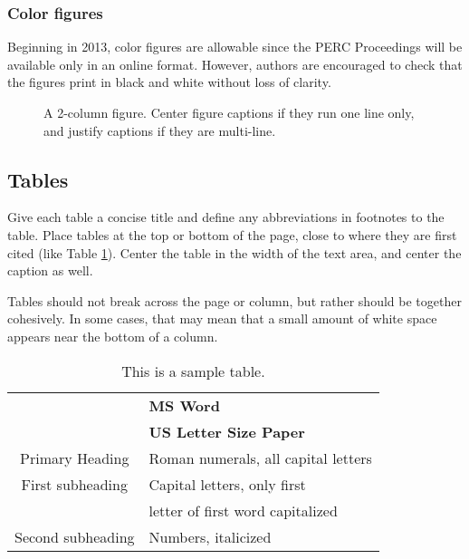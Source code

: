 \documentclass[english,aps,pra,reprint,noshowpacs,superscriptaddress]{revtex4-1}
\begin{document}
\subsubsection{Color figures}
Beginning in 2013, color figures are allowable since the PERC Proceedings will be available only in an online format.  However, authors are encouraged to check that the figures print in black and white without loss of clarity.

\begin{figure*}
\caption{A 2-column figure. Center figure captions if they run one line only, and justify captions if they are multi-line.\label{fig2}}
\end{figure*}


\subsection{Tables}
Give each table a concise title and define any abbreviations in footnotes to the table. Place tables at the top or bottom of the page, close to where they are first cited (like Table \ref{tab1}). Center the table in the width of the text area, and center the caption as well.

Tables should not break across the page or column, but rather should be together cohesively.  In some cases, that may mean that a small amount of white space appears near the bottom of a column.

\begin{table}[htbp]
\caption{This is a sample table.\label{tab1}}
\begin{ruledtabular}
\begin{tabular}{cl}
 & \textbf{MS Word} \\ 
 & \textbf{US Letter Size Paper} \\ 
 \hline
Primary Heading & Roman numerals, all capital letters \\
First subheading & Capital letters, only first \\
 & letter of first word capitalized \\
Second subheading & Numbers, italicized 
\end{tabular}
\end{ruledtabular}
\end{table}
\end{document}
